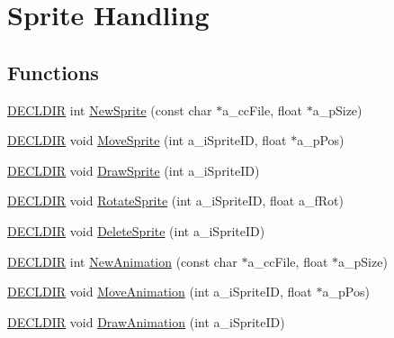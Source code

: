 \hypertarget{group___sprites}{\section{Sprite Handling}
\label{group___sprites}
}
\subsection*{Functions}
\begin{DoxyCompactItemize}
\item 
\hyperlink{_framework_8h_a6b6635274dbcf57e29a0140cd8cf0305}{D\-E\-C\-L\-D\-I\-R} int \hyperlink{group___sprites_ga29e4eac83d501466586bbc52a1550a98}{New\-Sprite} (const char $\ast$a\-\_\-cc\-File, float $\ast$a\-\_\-p\-Size)
\item 
\hyperlink{_framework_8h_a6b6635274dbcf57e29a0140cd8cf0305}{D\-E\-C\-L\-D\-I\-R} void \hyperlink{group___sprites_gad54ce5fc00b96467e1233629b2755553}{Move\-Sprite} (int a\-\_\-i\-Sprite\-I\-D, float $\ast$a\-\_\-p\-Pos)
\item 
\hyperlink{_framework_8h_a6b6635274dbcf57e29a0140cd8cf0305}{D\-E\-C\-L\-D\-I\-R} void \hyperlink{group___sprites_gaaf55d20e2ab66e7f2a2b3a5c1fe527bb}{Draw\-Sprite} (int a\-\_\-i\-Sprite\-I\-D)
\item 
\hyperlink{_framework_8h_a6b6635274dbcf57e29a0140cd8cf0305}{D\-E\-C\-L\-D\-I\-R} void \hyperlink{group___sprites_ga2a899d104386394a1aed082e59efa638}{Rotate\-Sprite} (int a\-\_\-i\-Sprite\-I\-D, float a\-\_\-f\-Rot)
\item 
\hyperlink{_framework_8h_a6b6635274dbcf57e29a0140cd8cf0305}{D\-E\-C\-L\-D\-I\-R} void \hyperlink{group___sprites_gaf5b28bfb475c742599c8cd248eb0d7fa}{Delete\-Sprite} (int a\-\_\-i\-Sprite\-I\-D)
\item 
\hyperlink{_framework_8h_a6b6635274dbcf57e29a0140cd8cf0305}{D\-E\-C\-L\-D\-I\-R} int \hyperlink{group___sprites_gae06234a69c164edbfe295e528af9d8b4}{New\-Animation} (const char $\ast$a\-\_\-cc\-File, float $\ast$a\-\_\-p\-Size)
\item 
\hyperlink{_framework_8h_a6b6635274dbcf57e29a0140cd8cf0305}{D\-E\-C\-L\-D\-I\-R} void \hyperlink{group___sprites_ga9f87459174ccaf119440af66479ab6c2}{Move\-Animation} (int a\-\_\-i\-Sprite\-I\-D, float $\ast$a\-\_\-p\-Pos)
\item 
\hyperlink{_framework_8h_a6b6635274dbcf57e29a0140cd8cf0305}{D\-E\-C\-L\-D\-I\-R} void \hyperlink{group___sprites_ga19ba1501f38a88afdf32ccd7e9e85b78}{Draw\-Animation} (int a\-\_\-i\-Sprite\-I\-D)
\item 

\end{DoxyCompactItemize}
